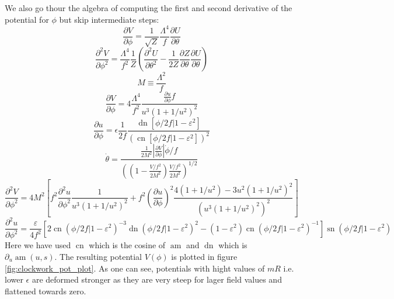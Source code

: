 \documentclass[master,       %
               twoside,        %
               BCOR10mm,       %
               english,ngerman, %
               ]{GAUBM}
\begin{document}
\begin{otherlanguage}{english}
We also go thour the algebra of computing the first and second derivative of the potential for $\phi$ but skip intermediate steps:
\begin{equation}
	\frac{\partial V}{\partial \phi} = \frac{1}{\sqrt{Z}} \frac{\Lambda^4}{f} \frac{\partial U}{\partial \theta}
\end{equation}
\begin{equation}
	\frac{\partial^2 V}{\partial \phi^2} = \frac{\Lambda^4}{f^2} \frac{1}{Z} \left( \frac{\partial^2 U}{\partial \theta^2} - \frac{1}{2 Z} \frac{\partial Z}{\partial \theta} \frac{\partial U}{\partial \theta} \right)
\end{equation}
\begin{equation}
	M \equiv \frac{\Lambda^2}{f}
\end{equation}
\begin{equation}
	\frac{\partial V}{\partial \phi} = 4 \frac{\Lambda^4}{f^2} \frac{\frac{\partial u}{\partial \phi} f}{u^3(1 + 1/u^2)^2}
\end{equation}
\begin{equation}
	\frac{\partial u}{\partial \phi} = \epsilon \frac{1}{2 f} \frac{\operatorname{dn}[\phi/2f|1 - \varepsilon^2]}{(\operatorname{cn}[\phi/2f|1 - \varepsilon^2])^2}
\end{equation}
\begin{equation}
	\dot{\theta} = \frac{\frac{1}{2M^2} \left| \frac{\partial V}{\partial \phi} \right| \dot{\phi} / f}{\left(\left(1 - \frac{V/f^2}{2M^2}\right) \frac{V / f^2}{2 M^2} \right)^{1/2}}
\end{equation}
\begin{equation}
	\frac{\partial^2 V}{\partial \phi^2} = 4 M^2 \left[ f^2 \frac{\partial^2 u}{\partial \phi^2} \frac{1}{u^3(1 + 1/u^2)^2} + f^2 \left( \frac{\partial u}{\partial \phi} \right)^2 \frac{4(1 + 1/u^2) - 3u^2(1 + 1/u^2)^2}{\left( u^3(1 + 1/u^2)^2 \right)^2} \right]
\end{equation}
\begin{equation}
	\frac{\partial^2 u}{\partial \phi^2} = \frac{\varepsilon}{4 f^2} \left[ 2 \operatorname{cn}(\phi/2f|1 - \varepsilon^2)^{-3} \operatorname{dn}(\phi/2f|1 - \varepsilon^2)^2 - (1 - \varepsilon^2) \operatorname{cn}(\phi/2f|1 - \varepsilon^2)^{-1} \right] \operatorname{sn}(\phi/2f|1 - \varepsilon^2)
\end{equation}
Here we have used $\operatorname{cn}$ which is the cosine of $\operatorname{am}$ and $\operatorname{dn}$ which is $\partial_u \operatorname{am}(u, s)$.
The resulting potential $V(\phi)$ is plotted in figure \ref{fig:clockwork_pot_plot}. As one can see, potentials with hight values of $mR$ i.e. lower $\epsilon$ are deformed stronger as they are very steep for lager field values and flattened towards zero.

\end{otherlanguage}
\end{document}
